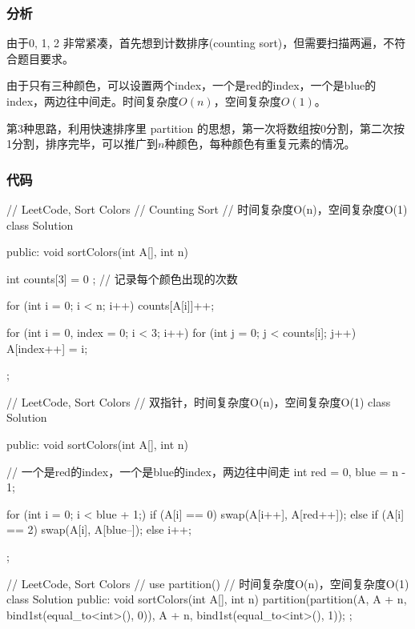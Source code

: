 \subsubsection{分析}
由于0, 1, 2 非常紧凑，首先想到计数排序(counting sort)，但需要扫描两遍，不符合题目要求。

由于只有三种颜色，可以设置两个index，一个是red的index，一个是blue的index，两边往中间走。时间复杂度$O(n)$，空间复杂度$O(1)$。

第3种思路，利用快速排序里 partition 的思想，第一次将数组按0分割，第二次按1分割，排序完毕，可以推广到$n$种颜色，每种颜色有重复元素的情况。


\subsubsection{代码}
\begin{Code}
// LeetCode, Sort Colors
// Counting Sort
// 时间复杂度O(n)，空间复杂度O(1)
class Solution {
public:
    void sortColors(int A[], int n) {
        int counts[3] = { 0 }; // 记录每个颜色出现的次数

        for (int i = 0; i < n; i++)
            counts[A[i]]++;

        for (int i = 0, index = 0; i < 3; i++)
            for (int j = 0; j < counts[i]; j++)
                A[index++] = i;

    }
};
\end{Code}

\begin{Code}
// LeetCode, Sort Colors
// 双指针，时间复杂度O(n)，空间复杂度O(1)
class Solution {
public:
    void sortColors(int A[], int n) {
        // 一个是red的index，一个是blue的index，两边往中间走
        int red = 0, blue = n - 1;

        for (int i = 0; i < blue + 1;) {
            if (A[i] == 0)
                swap(A[i++], A[red++]);
            else if (A[i] == 2)
                swap(A[i], A[blue--]);
            else
                i++;
        }
    }
};
\end{Code}

\begin{Code}
// LeetCode, Sort Colors
// use partition()
// 时间复杂度O(n)，空间复杂度O(1)
class Solution {
public:
    void sortColors(int A[], int n) {
        partition(partition(A, A + n, bind1st(equal_to<int>(), 0)), A + n,
                bind1st(equal_to<int>(), 1));
    }
};
\end{Code}

